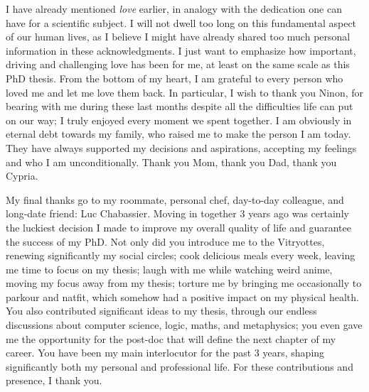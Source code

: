 I have already mentioned \emph{love} earlier, in analogy with the dedication one can have for a scientific subject. I will not dwell too long on this fundamental aspect of our human lives, as I believe I might have already shared too much personal information in these acknowledgments. I just want to emphasize how important, driving and challenging love has been for me, at least on the same scale as this PhD thesis. From the bottom of my heart, I am grateful to every person who loved me and let me love them back. In particular, I wish to thank you Ninon, for bearing with me during these last months despite all the difficulties life can put on our way; I truly enjoyed every moment we spent together. I am obviously in eternal debt towards my family, who raised me to make the person I am today. They have always supported my decisions and aspirations, accepting my feelings and who I am unconditionally. Thank you Mom, thank you Dad, thank you Cypria.

My final thanks go to my roommate, personal chef, day-to-day colleague, and long-date friend: Luc Chabassier. Moving in together 3 years ago was certainly the luckiest decision I made to improve my overall quality of life and guarantee the success of my PhD. Not only did you introduce me to the Vitryottes, renewing significantly my social circles; cook delicious meals every week, leaving me time to focus on my thesis; laugh with me while watching weird anime, moving my focus away from my thesis; torture me by bringing me occasionally to parkour and natfit, which somehow had a positive impact on my physical health. You also contributed significant ideas to my thesis, through our endless discussions about computer science, logic, maths, and metaphysics; you even gave me the opportunity for the post-doc that will define the next chapter of my career. You have been my main interlocutor for the past 3 years, shaping significantly both my personal and professional life. For these contributions and presence, I thank you.